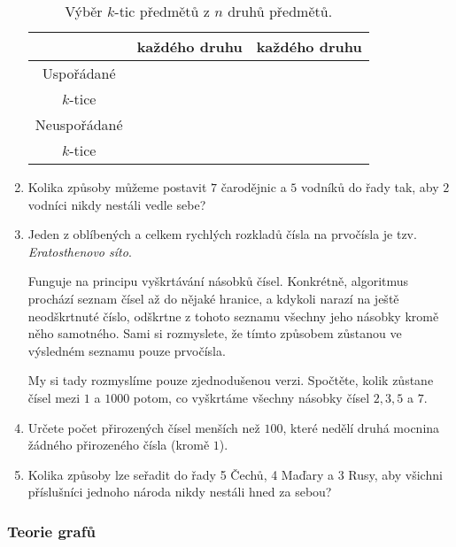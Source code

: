 \begin{enumerate}
\begin{table}[h]
\begin{tabular}{c|c|c}
    & každého druhu & každého druhu\\
    \midrule
    Uspořádané& &\\
    $k$-tice& &\\
    \midrule
    Neuspořádané & &\\
    $k$-tice& &
   \end{tabular}
   \caption{Výběr $k$-tic předmětů z $n$ druhů předmětů.}
   \label{table:vyber-k-z-n-2}
  \end{table}
 \item Kolika způsoby můžeme postavit $7$ čarodějnic a $5$ vodníků do řady tak,
  aby $2$ vodníci nikdy nestáli vedle sebe? \item Jeden z oblíbených a celkem
  rychlých rozkladů čísla na prvočísla je tzv. \emph{Eratosthenovo síto}.
 
  Funguje na principu vyškrtávání násobků čísel. Konkrétně, algoritmus prochází
  seznam čísel až do nějaké hranice, a kdykoli narazí na ještě neodškrtnuté
  číslo, odškrtne z tohoto seznamu všechny jeho násobky kromě něho samotného.
  Sami si rozmyslete, že tímto způsobem zůstanou ve výsledném seznamu pouze
  prvočísla.

  My si tady rozmyslíme pouze zjednodušenou verzi. Spočtěte, kolik zůstane
  čísel mezi $1$ a $1000$ potom, co vyškrtáme všechny násobky čísel $2,3,5$ a
  $7$.
 \item Určete počet přirozených čísel menších než $100$, které nedělí druhá
  mocnina žádného přirozeného čísla (kromě $1$).
 \item Kolika způsoby lze seřadit do řady 5 Čechů, 4 Maďary a 3 Rusy, aby
  všichni příslušníci jednoho národa nikdy nestáli hned za sebou?
\end{enumerate}

\subsubsection*{Teorie grafů}


